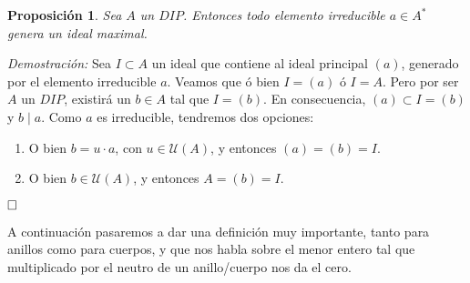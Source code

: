 \documentclass[12pt]{article}
\newtheorem{proposition}[theorem]{Proposición}
\begin{document}
\begin{proposition} Sea $A$ un $DIP$. Entonces todo elemento irreducible $a \in A^{\ast}$ genera un ideal maximal.
\end{proposition}
\emph{Demostración: } Sea $I \subset A$ un ideal que contiene al ideal principal $(a)$, generado por el elemento irreducible $a$. Veamos que ó bien $I = (a)$ ó $I = A$. Pero por ser $A$ un $DIP$, existirá un $b \in A$ tal que $I = (b)$. En consecuencia, $(a) \subset I = (b)$ y $b \mid a$. Como $a$ es irreducible, tendremos dos opciones: \begin{enumerate}
\item O bien $b = u \cdot a$, con $u \in \mathcal{U}(A)$, y entonces $(a) = (b) = I$.
\item O bien $b \in \mathcal{U}(A)$, y entonces $A = (b) = I$.
\end{enumerate}

$\hfill \square$

A continuación pasaremos a dar una definición muy importante, tanto para anillos como para cuerpos, y que nos habla sobre el menor entero tal que multiplicado por el neutro de un anillo/cuerpo nos da el cero. 
\end{document}
